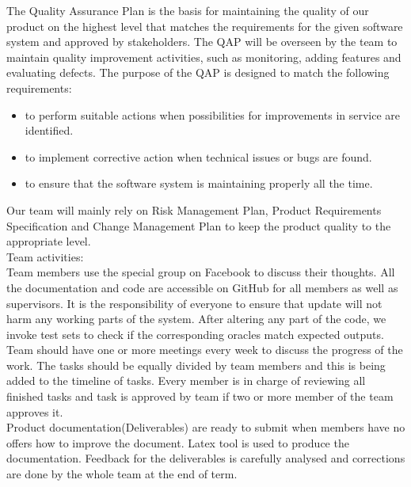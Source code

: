\documentclass{l3deliverable}
\begin{document}
{The Quality Assurance Plan is the basis for maintaining the quality of our product on the highest level that matches the requirements for the given software system and approved by stakeholders. The QAP will be overseen by the team to maintain quality improvement activities, such as monitoring, adding features and evaluating defects. The purpose of the QAP is designed to match the following requirements:\\

\begin{itemize}
\item to perform suitable actions when possibilities for improvements in service are identified.\\
\item to implement corrective action when technical issues or bugs are found.\\
\item to ensure that the software system is maintaining properly all the time.\\
\end{itemize}

Our team will mainly rely on Risk Management Plan, Product Requirements Specification and Change Management Plan to keep the product quality to the appropriate level.\\

Team activities:\\

Team members use the special group on Facebook to discuss their thoughts. All the documentation and code are  accessible on GitHub for all members as well as supervisors. It is the responsibility of everyone to ensure that update will not harm any working parts of the system. After altering any part of the code, we invoke test sets to check if the corresponding oracles match expected outputs.\\ 

Team should have one or more meetings every week to discuss the progress of the work. The tasks should be equally divided by team members and this is being added to the timeline of tasks. Every member is in charge of reviewing all finished tasks and task is approved by team if two or more member of the team approves it. \\

Product documentation(Deliverables) are ready to submit when members have no offers how to improve the document. Latex tool is used to produce the documentation.  Feedback for the deliverables is carefully analysed and corrections are done by the whole team at the end of term.\\

}
\end{document}
